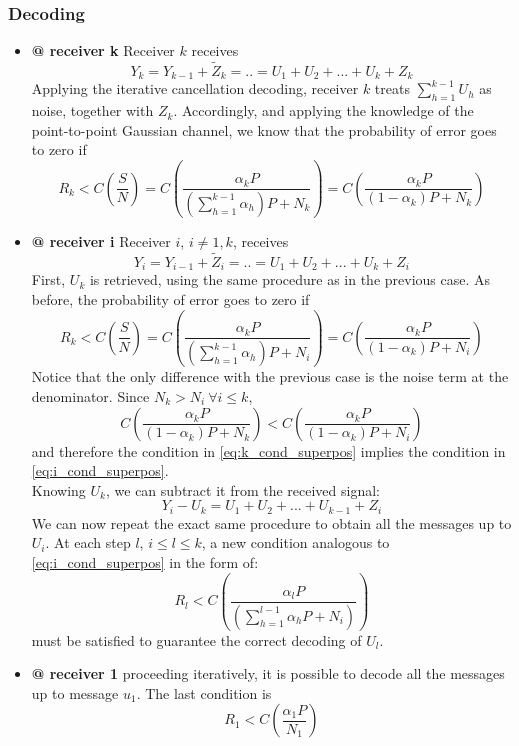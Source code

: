 \subsubsection*{Decoding}
\begin{itemize}
\item \textbf{@ receiver k} Receiver $k$ receives
\begin{equation}
Y_k = Y_{k-1}+\tilde{Z}_k = .. = U_1 + U_2 + ... +U_k + Z_k
\end{equation}
Applying the iterative cancellation decoding, receiver $k$ treats $\sum_{h=1}^{k-1} U_h$ as noise, together with $Z_k$. Accordingly, and applying the knowledge of the point-to-point Gaussian channel, we know that the probability of error goes to zero if
\begin{equation}
  R_k<C\left(\frac{S}{N}\right) = C\left(\frac{\alpha_k P}{\left(\sum_{h=1}^{k-1}\alpha_h \right)P + N_k}\right) = C\left(\frac{\alpha_k P}{\left(1-\alpha_k\right)P + N_k}\right)
  \label{eq:k_cond_superpos}
\end{equation}
\item \textbf{@ receiver i} Receiver $i$, $i\neq 1,k$, receives
\begin{equation}
Y_i = Y_{i-1}+\tilde{Z}_i = .. = U_1 + U_2 + ... +U_k + Z_i
\end{equation}
First, $U_k$ is retrieved, using the same procedure as in the previous case.
As before, the probability of error goes to zero if
\begin{equation}
  R_k<C\left(\frac{S}{N}\right) = C\left(\frac{\alpha_k P}{\left(\sum_{h=1}^{k-1}\alpha_h \right)P + N_i}\right) = C\left(\frac{\alpha_k P}{\left(1-\alpha_k\right)P + N_i}\right)
  \label{eq:i_cond_superpos}
\end{equation}
Notice that the only difference with the previous case is the noise term at the denominator. Since $N_k>N_i\ \forall i\leq k$,
\begin{equation}
  C\left(\frac{\alpha_k P}{\left(1-\alpha_k\right)P + N_k}\right)<C\left(\frac{\alpha_k P}{\left(1-\alpha_k\right)P + N_i}\right)
\end{equation}
and therefore the condition in \eqref{eq:k_cond_superpos} implies the condition in \eqref{eq:i_cond_superpos}.\\
Knowing $U_k$, we can subtract it from the received signal:
\begin{equation}
Y_i - U_k = U_1 + U_2 + ... +U_{k-1} + Z_i
\end{equation}
We can now repeat the exact same procedure to obtain all the messages up to $U_i$. At each step $l$, $i\leq l \leq k$, a new condition analogous to \eqref{eq:i_cond_superpos} in the form of:
\begin{equation}
  R_l< C\left(\frac{\alpha_l P}{\left(\sum_{h=1}^{l-1}\alpha_h P+N_i\right)}\right)
\end{equation}
 must be satisfied to guarantee the correct decoding of $U_l$.
\item \textbf{@ receiver 1} proceeding iteratively, it is possible to decode all the messages up to message $u_1$. The last condition is
\begin{equation}
  R_1<C\left(\frac{\alpha_1 P}{N_1}\right)
\end{equation}
\end{itemize}
